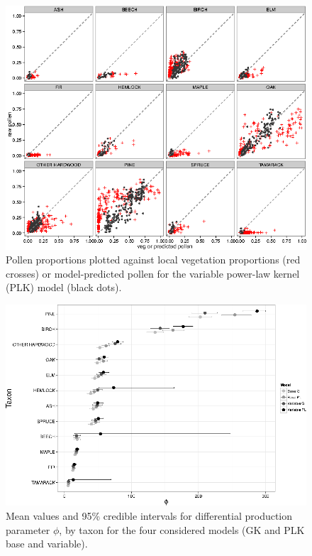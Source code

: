 \begin{figure}
\centering
\includegraphics[width=7in]{figures/pollen_preds_pl_Ka_Kgamma.png}
\caption[Pollen-vegetation scatter, predicted]{\internallinenumbers \doublespacing Pollen
  proportions plotted against local vegetation proportions (red
  crosses) or model-predicted pollen for the variable power-law kernel
  (PLK) model (black dots).}
\label{fig:preds}
\end{figure}

\begin{figure}
\centering
\includegraphics[width=7in]{figures/phi.png}
\caption[]{\internallinenumbers \doublespacing Mean values and 95\% credible intervals for differential
  production parameter $\phi$, by taxon for the four considered
  models  (GK and PLK base and variable).}
\label{fig:phi}
\end{figure}

